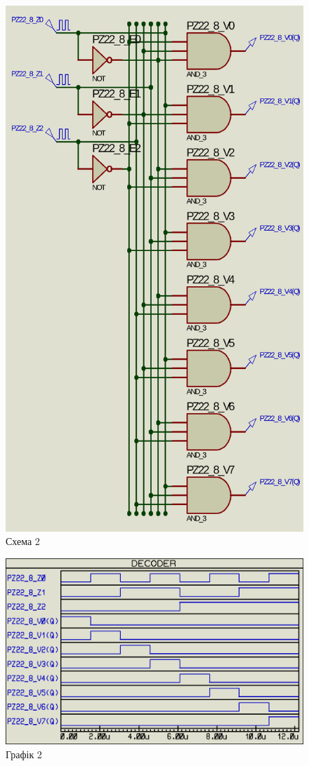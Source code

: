 \documentclass{article}
\begin{document}
\begin{normalsize}
	\begin{figure}[H]
		\centering
		\includegraphics[scale=0.34]{s2}	
		\caption{Схема 2}
	\end{figure}
	\begin{figure}[H]
		\centering
		\includegraphics[scale=0.34]{g2}	
		\caption{Графік 2}
	\end{figure}


\end{normalsize}
\end{document}
